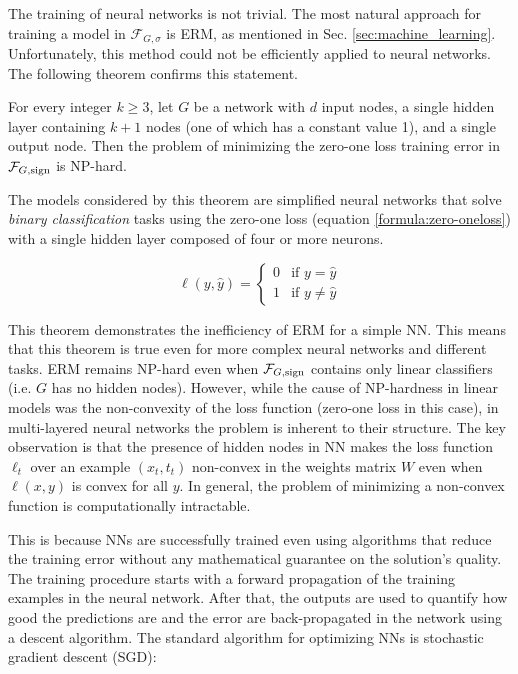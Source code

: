 The training of neural networks is not trivial. The most natural approach for training a model in $\mathcal{F}_{G,\sigma}$ is ERM, as mentioned in Sec. \ref{sec:machine_learning}.
Unfortunately, this method could not be efficiently applied to neural networks. The following theorem confirms this statement.

\begin{theorem}
	For every integer $k \geq 3$, let $G$ be a network with $d$ input nodes, a single hidden layer containing $k + 1$ nodes (one of which has a constant value 1), and a single output node. Then the problem of minimizing the zero-one loss training error in $\mathcal{F}_{G,\operatorname{sign}}$ is NP-hard. 
\end{theorem}

The models considered by this theorem are simplified neural networks that solve \textit{binary classification} tasks using the zero-one loss (equation \ref{formula:zero-oneloss}) with a single hidden layer composed of four or more neurons. 

\begin{equation}
\label{formula:zero-oneloss}
\ell(y, \hat y) = 
\begin{cases}
0 & \text{if $y = \hat y$} \\
1 & \text{if $y \neq \hat y$}
\end{cases}
\end{equation}

This theorem demonstrates the inefficiency of ERM for a simple NN. This means that this theorem is true even for more complex neural networks and different tasks. ERM remains NP-hard even when $\mathcal{F}_{G,\operatorname{sign}}$ contains only linear classifiers (i.e. $G$ has no hidden nodes). However, while the cause of NP-hardness in linear models was the non-convexity of the loss function (zero-one loss in this case), in multi-layered neural networks the problem is inherent to their structure. The key observation is that the presence of hidden nodes in NN makes the loss function $\ell_t$ over an example $(x_t, t_t)$ non-convex in the weights matrix $W$ even when $\ell(x, y)$ is convex for all $y$. In general, the problem of minimizing a non-convex function is computationally intractable.  

This is because NNs are successfully trained even using algorithms that reduce the training error without any mathematical guarantee on the solution's quality. The training procedure starts with a forward propagation of the training examples in the neural network. After that, the outputs are used to quantify how good the predictions are and the error are back-propagated in the network using a descent algorithm. The standard algorithm for optimizing NNs is stochastic gradient descent (SGD):

